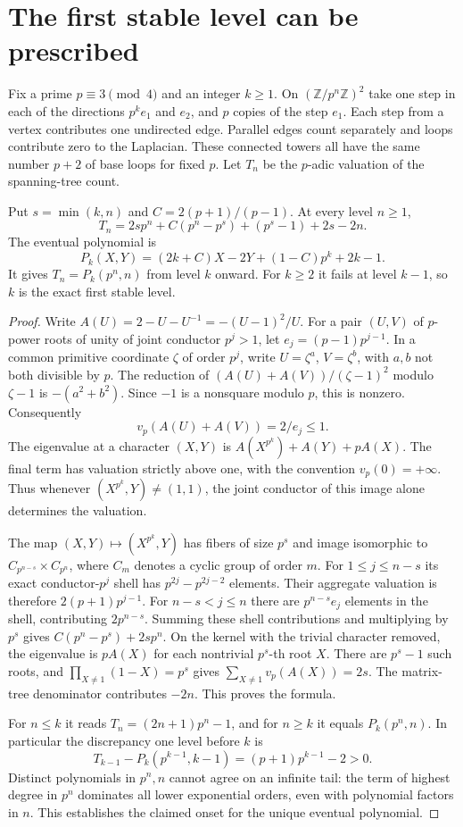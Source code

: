 \section{The first stable level can be prescribed}

Fix a prime $p\equiv3\pmod4$ and an integer $k\ge1$. On
$(\mathbb Z/p^n\mathbb Z)^2$ take one step in each of the directions
$p^k e_1$ and $e_2$, and $p$ copies of the step $e_1$. Each step from a
vertex contributes one undirected edge. Parallel edges count separately
and loops contribute zero to the Laplacian. These connected towers
all have the same number $p+2$ of base loops for fixed $p$.
Let $T_n$ be the $p$-adic valuation of the spanning-tree count.

\begin{theorem}
Put $s=\min(k,n)$ and $C=2(p+1)/(p-1)$. At every level $n\ge1$,
\[
 T_n=2s p^n+C(p^n-p^s)+(p^s-1)+2s-2n .
\]
The eventual polynomial is
\[
 P_k(X,Y)=(2k+C)X-2Y+(1-C)p^k+2k-1.
\]
It gives $T_n=P_k(p^n,n)$ from level $k$ onward. For $k\ge2$ it fails
at level $k-1$, so $k$ is the exact first stable level.
\end{theorem}

\begin{proof}
Write $A(U)=2-U-U^{-1}=-(U-1)^2/U$.
For a pair $(U,V)$ of $p$-power roots of unity of joint conductor $p^j>1$,
let $e_j=(p-1)p^{j-1}$. In a common primitive coordinate $\zeta$ of order
$p^j$, write $U=\zeta^a$, $V=\zeta^b$, with $a,b$ not both divisible
by $p$. The reduction of
$(A(U)+A(V))/(\zeta-1)^2$ modulo $\zeta-1$ is $-(a^2+b^2)$. Since
$-1$ is a nonsquare modulo $p$, this is nonzero. Consequently
\[
 v_p(A(U)+A(V))=2/e_j\le1 .
\]
The eigenvalue at a character $(X,Y)$ is
$A(X^{p^k})+A(Y)+pA(X)$. The final term has valuation strictly above one,
with the convention $v_p(0)=+\infty$. Thus whenever
$(X^{p^k},Y)\ne(1,1)$, the joint conductor of this image alone determines
the valuation.

The map $(X,Y)\mapsto(X^{p^k},Y)$ has fibers of size $p^s$ and image
isomorphic to $C_{p^{n-s}}\times C_{p^n}$, where $C_m$ denotes a cyclic
group of order $m$. For $1\le j\le n-s$ its exact conductor-$p^j$ shell
has $p^{2j}-p^{2j-2}$ elements. Their aggregate valuation is therefore
$2(p+1)p^{j-1}$. For $n-s<j\le n$ there are $p^{n-s}e_j$ elements in
the shell, contributing $2p^{n-s}$. Summing these shell contributions
and multiplying by $p^s$ gives $C(p^n-p^s)+2s p^n$.
On the kernel with the trivial character removed, the eigenvalue is
$pA(X)$ for each nontrivial $p^s$-th root $X$. There are $p^s-1$ such
roots, and
$\prod_{X\ne1}(1-X)=p^s$ gives $\sum_{X\ne1}v_p(A(X))=2s$.
The matrix-tree denominator contributes $-2n$. This proves the formula.

For $n\le k$ it reads $T_n=(2n+1)p^n-1$, and for $n\ge k$ it equals
$P_k(p^n,n)$. In particular the discrepancy one level before $k$ is
\[
 T_{k-1}-P_k(p^{k-1},k-1)=(p+1)p^{k-1}-2>0 .
\]
Distinct polynomials in $p^n,n$ cannot agree on an infinite tail:
the term of highest degree in $p^n$ dominates all lower exponential
orders, even with polynomial factors in $n$. This establishes the
claimed onset for the unique eventual polynomial.
\end{proof}

